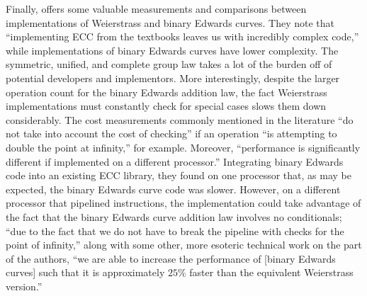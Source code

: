 Finally, \cite{moloneyefficient} offers some valuable measurements and
    comparisons between implementations of Weierstrass and binary Edwards
    curves.
They note that ``implementing ECC from the textbooks leaves us with incredibly
    complex code,'' while implementations of binary Edwards curves have lower
    complexity.
The symmetric, unified, and complete group law takes a lot of the burden off of
    potential developers and implementors.
More interestingly, despite the larger operation count for the binary Edwards
    addition law, the fact Weierstrass implementations must constantly check
    for special cases slows them down considerably.
The cost measurements commonly mentioned in the literature ``do not take into
account the cost of checking'' if an operation ``is attempting to double the
    point at infinity,'' for example.
Moreover, ``performance is significantly different if implemented on a
    different processor.''
Integrating binary Edwards code into an existing ECC library, they found on one
    processor that, as may be expected, the binary Edwards curve code was
    slower.
However, on a different processor that pipelined instructions, the
    implementation could take advantage of the fact that the binary Edwards
    curve addition law involves no conditionals; ``due to the fact that we do
    not have to break the pipeline with checks for the point of infinity,''
    along with some other, more esoteric technical work on the part of the
    authors, ``we are able to increase the performance of [binary Edwards
    curves] such that it is approximately $25\%$ faster than the equivalent
    Weierstrass version.''
